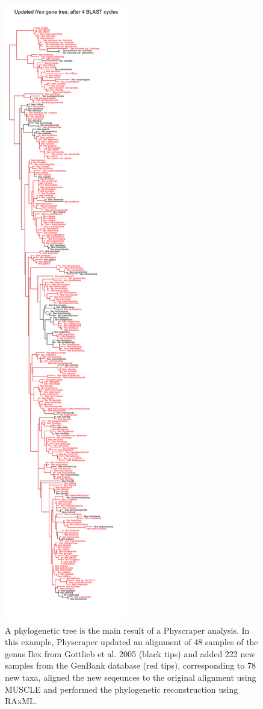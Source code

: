 \documentclass[]{article}
\begin{document}
\begin{figure}
\includegraphics[width=1\linewidth]{docs/figs/ilex-plot-tips-and-branches-1} \caption{A phylogenetic tree is the main result of a Physcraper analysis. In this example, Physcraper updated an alignment of 48 samples of the genus Ilex from Gottlieb et al. 2005 (black tips) and added 222 new samples from the GenBank database (red tips), corresponding to 78 new taxa, aligned the new seqeunces to the original alignment using MUSCLE and performed the phylogenetic reconstruction using RAxML.}\label{fig:ilex-updated-tree}
\end{figure}
\end{document}
